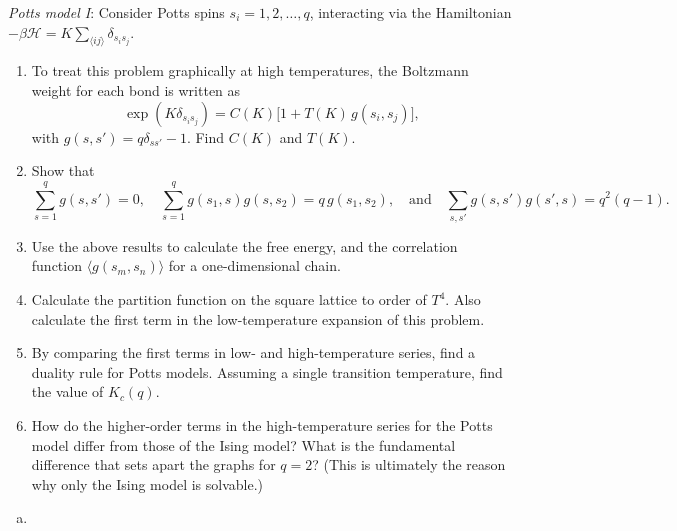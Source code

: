 \begin{problem}
    \textit{Potts model I}: Consider Potts spins $s_i = 1, 2, \ldots, q$, interacting via the Hamiltonian $-\beta\mathcal{H} = K\sum_{\langle ij\rangle}\delta_{s_i s_j}$.

    \begin{enumerate}
        \item[(a)] To treat this problem graphically at high temperatures, the Boltzmann weight for each bond is written as
        \[
            \exp(K\delta_{s_i s_j}) = C(K)\bigl[1 + T(K)\,g(s_i, s_j)\bigr],
        \]
        with $g(s, s') = q\delta_{ss'} - 1$. Find $C(K)$ and $T(K)$.

        \item[(b)] Show that
        \[
            \sum_{s=1}^q g(s, s') = 0, \quad \sum_{s=1}^q g(s_1, s)g(s, s_2) = q\,g(s_1, s_2), \quad \text{and} \quad \sum_{s,s'}g(s,s')g(s',s) = q^2(q-1).
        \]

        \item[(c)] Use the above results to calculate the free energy, and the correlation function $\langle g(s_m, s_n)\rangle$ for a one-dimensional chain.

        \item[(d)] Calculate the partition function on the square lattice to order of $T^4$. Also calculate the first term in the low-temperature expansion of this problem.

        \item[(e)] By comparing the first terms in low- and high-temperature series, find a duality rule for Potts models. Assuming a single transition temperature, find the value of $K_c(q)$.

        \item[(f)] How do the higher-order terms in the high-temperature series for the Potts model differ from those of the Ising model? What is the fundamental difference that sets apart the graphs for $q = 2$? (This is ultimately the reason why only the Ising model is solvable.)
    \end{enumerate}
\end{problem}

\begin{solution}
    \begin{enumerate}[(a)]
        \item
    \end{enumerate}
\end{solution}

